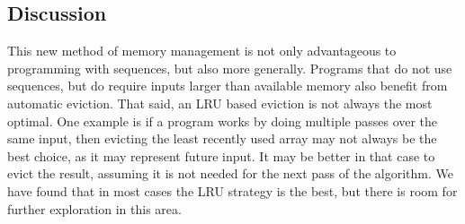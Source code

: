 \subsection{Discussion}

This new method of memory management is not only advantageous to programming with sequences, but also more generally. Programs that do not use sequences, but do require inputs larger than available memory also benefit from automatic eviction. That said, an LRU based eviction is not always the most optimal. One example is if a program works by doing multiple passes over the same input, then evicting the least recently used array may not always be the best choice, as it may represent future input. It may be better in that case to evict the result, assuming it is not needed for the next pass of the algorithm. We have found that in most cases the LRU strategy is the best, but there is room for further exploration in this area.
